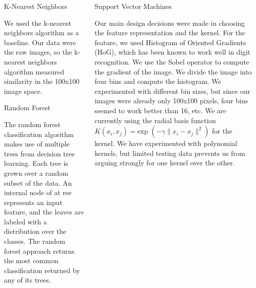 \documentclass[final]{beamer}
\newlength{\onecolwid}
\newlength{\twocolwid}
\begin{document}
\begin{frame}[t]
\begin{columns}[t]
\begin{column}{\twocolwid}
\begin{columns}[t,totalwidth=\twocolwid]
\begin{column}{\onecolwid} %


\begin{block}{K-Nearest Neighbors}

We used the k-nearest neighbors algorithm as a baseline. Our data were the raw images, so the k-nearest neighbors algorithm measured similarity in the 100x100 image space.

\end{block}

\begin{block}{Random Forest}

The random forest classification algorithm makes use of multiple trees from decision tree learning. Each tree is grown over a random subset of the data. An internal node of at ree represents an input feature, and the leaves are labeled with a distribution over the classes. The random forest approach returns the most common classification returned by any of its trees. 

\end{block}


\end{column} %

\begin{column}{\onecolwid} %


\begin{block}{Support Vector Machines}

Our main design decisions were made in choosing the feature representation and the kernel. For the feature, we used Histogram of Oriented Gradients (HoG), which has been known to work well in digit recognition. We use the Sobel operator to compute the gradient of the image. We divide the image into four bins and compute the histogram. We experimented with different bin sizes, but since our images were already only 100x100 pixels, four bins seemed to work better than 16, etc. We are currently using the radial basis function $K(x_i, x_j) = \mbox{exp }(-\gamma \|x_i - x_j\|^2)$ for the kernel. We have experimented with polynomial kernels, but limited testing data prevents us from arguing strongly for one kernel over the other.


\end{block}
\end{column}
\end{columns}
\end{column}
\end{columns}
\end{frame}
\end{document}
